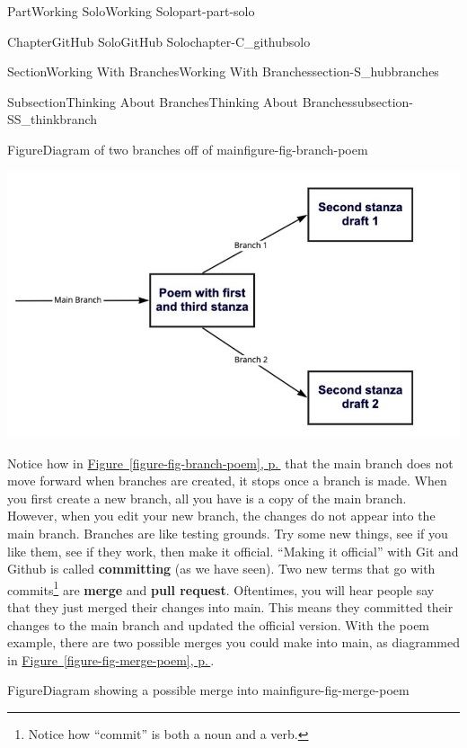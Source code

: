 \documentclass[twoside,10pt,]{book}
\newcommand{\xreffont}{\relax}
\newcommand{\terminology}[1]{\textbf{#1}}
\begin{document}
\begin{partptx}{Part}{Working Solo}{}{Working Solo}{}{}{part-part-solo}
\begin{chapterptx}{Chapter}{GitHub Solo}{}{GitHub Solo}{}{}{chapter-C_githubsolo}
\begin{sectionptx}{Section}{Working With Branches}{}{Working With Branches}{}{}{section-S_hubbranches}
\begin{subsectionptx}{Subsection}{Thinking About Branches}{}{Thinking About Branches}{}{}{subsection-SS_thinkbranch}
\begin{figureptx}{Figure}{Diagram of two branches off of main}{figure-fig-branch-poem}{}%
\begin{image}{0}{1}{0}{}%
\includegraphics[width=\linewidth]{external/branch_poem.pdf}
\end{image}%
\tcblower
\end{figureptx}%
 Notice how in \hyperref[figure-fig-branch-poem]{Figure~{\xreffont\ref{figure-fig-branch-poem}}, p.\,\pageref{figure-fig-branch-poem}} that the main branch does not move forward when branches are created, it stops once a branch is made. When you first create a new branch, all you have is a copy of the main branch. However, when you edit your new branch, the changes do not appear into the main branch. Branches are like testing grounds. Try some new things, see if you like them, see if they work, then make it official. ``Making it official'' with Git and Github is called \terminology{committing} (as we have seen). Two new terms that go with commits\footnote{Notice how ``commit'' is both a noun and a verb.\label{fn-SS_thinkbranch-i-k}} are \terminology{merge} and \terminology{pull request}. Oftentimes, you will hear people say that they just merged their changes into main. This means they committed their changes to the main branch and updated the official version. With the poem example, there are two possible merges you could make into main, as diagrammed in \hyperref[figure-fig-merge-poem]{Figure~{\xreffont\ref{figure-fig-merge-poem}}, p.\,\pageref{figure-fig-merge-poem}}.%
\begin{figureptx}{Figure}{Diagram showing a possible merge into main}{figure-fig-merge-poem}{}%

\end{figureptx}
\end{subsectionptx}
\end{sectionptx}
\end{chapterptx}
\end{partptx}
\end{document}
